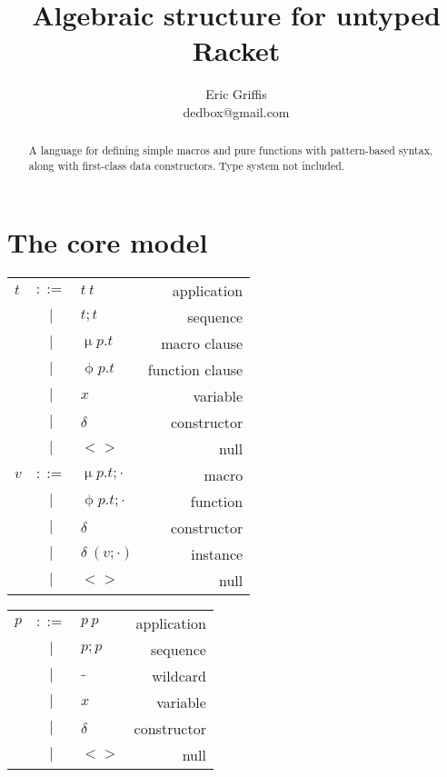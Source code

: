 \documentclass[letterpaper,12pt]{article}
\title{Algebraic structure for untyped Racket}
\author{Eric Griffis \\ dedbox@gmail.com}
\makeatletter
\newenvironment{Grammar}
{
  \begin{tabular*}{\linewidth}{
    >{$}l<{$}
    >{$}c<{$}
    >{$}l<{$}
    @{\extracolsep{\fill}}
    r}
}{
  \end{tabular*}
}
\newcommand\OR{\ensuremath{~|~}}
\def\Mac{\upmu}
\def\Fun{\upphi}
\def\Con{\delta}
\makeatother
\begin{document}
\maketitle

\begin{abstract}
  A language for defining simple macros and pure functions with pattern-based
  syntax, along with first-class data constructors. Type system not included.
\end{abstract}

\section{The core model}
\label{sec:core-model}

\begin{minipage}[t]{0.45\linewidth}
  \vspace{0pt}
  \begin{Grammar}
    t
    & ::= & t~t      & application     \\
    & \OR & t;t      & sequence        \\
    & \OR & \Mac p.t & macro clause    \\
    & \OR & \Fun p.t & function clause \\
    & \OR & x        & variable        \\
    & \OR & \Con     & constructor     \\
    & \OR & <>       & null            \\
    v
    & ::= & \Mac p.t;\cdot & macro       \\
    & \OR & \Fun p.t;\cdot & function    \\
    & \OR & \Con           & constructor \\
    & \OR & \Con~(v;\cdot) & instance    \\
    & \OR & <>             & null        \\
  \end{Grammar}
\end{minipage}
\hfill
\begin{minipage}[t]{0.45\linewidth}
  \vspace{0pt}
  \begin{Grammar}
    p
    & ::= & p~p  & application \\
    & \OR & p;p  & sequence    \\
    & \OR & \_   & wildcard    \\
    & \OR & x    & variable    \\
    & \OR & \Con & constructor \\
    & \OR & <>   & null        \\
  \end{Grammar}
\end{minipage}
\end{document}
